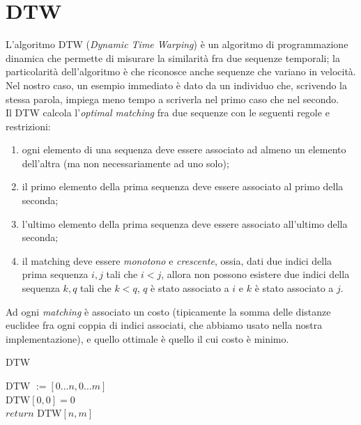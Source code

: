 \documentclass[8pt,notitlepage]{report}
\begin{document}
	\section{DTW}
		L'algoritmo DTW (\textit{Dynamic Time Warping}) è un algoritmo di programmazione dinamica che permette di misurare la similarità fra due sequenze temporali; la particolarità dell'algoritmo è che riconosce anche sequenze che variano in velocità. Nel nostro caso, un esempio immediato è dato da un individuo che, scrivendo la stessa parola, impiega meno tempo a scriverla nel primo caso che nel secondo. \\
		Il DTW calcola l'\textit{optimal matching} fra due sequenze con le seguenti regole e restrizioni:
		\begin{enumerate}
			\item ogni elemento di una sequenza deve essere associato ad almeno un elemento dell'altra (ma non necessariamente ad uno solo);
			\item il primo elemento della prima sequenza deve essere associato al primo della seconda;
			\item l'ultimo elemento della prima sequenza deve essere associato all'ultimo della seconda;
			\item il matching deve essere \textit{monotono} e \textit{crescente}, ossia, dati due indici della prima sequenza $ i, j $ tali che $ i < j $, allora non possono esistere due indici della sequenza $ k, q $ tali che $ k < q $, $ q $ è stato associato a $ i $ e $ k $ è stato associato a $ j $.
		\end{enumerate}
		Ad ogni \textit{matching} è associato un costo (tipicamente la somma delle distanze euclidee fra ogni coppia di indici associati, che abbiamo usato nella nostra implementazione), e quello ottimale è quello il cui costo è minimo.
		\begin{algorithm}[h]
			\SetAlgoLined
			\caption{DTW}
				$ \text{DTW } :=  [0 \dots n, 0 \dots m] $ \\
				$ \text{DTW}[0, 0] = 0 $ \\
				$ \textit{return } \text{DTW}[n, m] $
		\end{algorithm}
		
\end{document}
